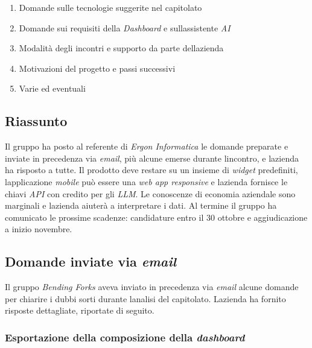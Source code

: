 \documentclass[12pt,a4paper]{article}
\newcommand{\tightlist}{\setlength{\itemsep}{1pt}\setlength{\parskip}{0pt}}
\begin{document}
\begin{enumerate}
\def\labelenumi{\arabic{enumi}.}
\tightlist
\item
  Domande sulle tecnologie suggerite nel capitolato
\item
  Domande sui requisiti della \emph{Dashboard} e sull\textquotesingle assistente \emph{AI}
\item
  Modalità degli incontri e supporto da parte dell\textquotesingle azienda
\item
  Motivazioni del progetto e passi successivi
\item
  Varie ed eventuali
\end{enumerate}

\hypertarget{riassunto}{%
\subsection{Riassunto}}

Il gruppo ha posto al referente di \emph{Ergon Informatica} le domande preparate e inviate in precedenza via \emph{email}, più alcune emerse durante l\textquotesingle incontro, e l\textquotesingle azienda ha risposto a tutte. Il prodotto deve restare su un insieme di \emph{widget} predefiniti, l\textquotesingle applicazione \emph{mobile} può essere una \emph{web app responsive} e l\textquotesingle azienda fornisce le chiavi \emph{API} con credito per gli \emph{LLM}. Le conoscenze di economia aziendale sono marginali e l\textquotesingle azienda aiuterà a interpretare i dati. Al termine il gruppo ha comunicato le prossime scadenze: candidature entro il 30 ottobre e aggiudicazione a inizio novembre.

\hypertarget{domande-inviate-via-email}{%
\subsection{\texorpdfstring{Domande inviate via \emph{email}}{Domande inviate via email}}}

Il gruppo \emph{Bending Forks} aveva inviato in precedenza via \emph{email} alcune domande per chiarire i dubbi sorti durante l\textquotesingle analisi del capitolato. L\textquotesingle azienda ha fornito risposte dettagliate, riportate di seguito.

\hypertarget{esportazione-della-composizione-della-dashboard}{%
\subsubsection{\texorpdfstring{Esportazione della composizione della \emph{dashboard}}{Esportazione della composizione della dashboard}}}
\end{document}
